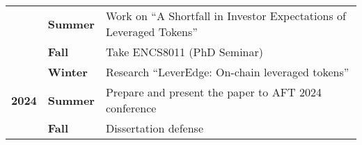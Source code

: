 \begin{table}[h]
{\begin{tabular}{|c|l|l|}
			& \textbf{Summer} & Work on ``A Shortfall in Investor Expectations of Leveraged Tokens'' \\ \cline{2-3} 
			& \textbf{Fall} & Take ENCS8011 (PhD Seminar) \\ \hline
			\multirow{3}{*}{\textbf{2024}} & \textbf{Winter} & Research ``LeverEdge: On-chain leveraged tokens'' \\ \cline{2-3} 
			& \textbf{Summer} & Prepare and present the paper to AFT 2024 conference \\ \cline{2-3} 
			& \textbf{Fall} & Dissertation defense \\ \hline
		\end{tabular}%
	}
\end{table}

